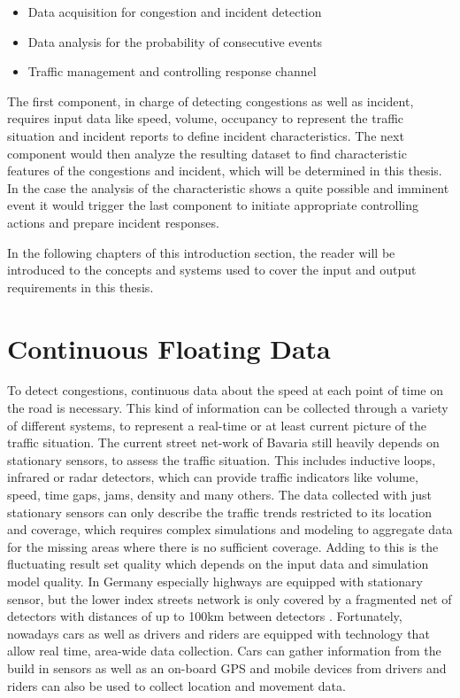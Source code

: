 \documentclass[a4paper,12pt]{report}
\begin{document}
\begin{itemize}
  \item Data acquisition for congestion and incident detection
  \item Data analysis for the probability of consecutive events
  \item Traffic management and controlling response channel
\end{itemize}

\par The first component, in charge of detecting congestions as well as incident, requires input data like speed, volume, occupancy to represent the traffic situation and incident reports to define incident characteristics. The next component would then analyze the resulting dataset to find characteristic features of the congestions and incident, which will be determined in this thesis. In the case the analysis of the characteristic shows a quite possible and imminent event it would trigger the last component to initiate appropriate controlling actions and prepare incident responses.\newline
\par In the following chapters of this introduction section, the reader will be introduced to the concepts and systems used to cover the input and output requirements in this thesis.

\section{Continuous Floating Data}

\par To detect congestions, continuous data about the speed at each point of time on the road is necessary. This kind of information can be collected through a variety of different systems, to represent a real-time or at least current picture of the traffic situation. The current street net-work of Bavaria still heavily depends on stationary sensors, to assess the traffic situation. This includes inductive loops, infrared or radar detectors, which can provide traffic indicators like volume, speed, time gaps, jams, density and many others. The data collected with just stationary sensors can only describe the traffic trends restricted to its location and coverage, which requires complex simulations and modeling to aggregate data for the missing areas where there is no sufficient coverage. Adding to this is the fluctuating result set quality which depends on the input data and simulation model quality. In Germany especially highways are equipped with stationary sensor, but the lower index streets network is only covered by a fragmented net of detectors with distances of up to 100km between detectors \cite{INDRIX2015}. Fortunately, nowadays cars as well as drivers and riders are equipped with technology that allow real time, area-wide data collection. Cars can gather information from the build in sensors as well as an on-board GPS and mobile devices from drivers and riders can also be used to collect location and movement data. \cite{Randelhoff2016}
\end{document}
